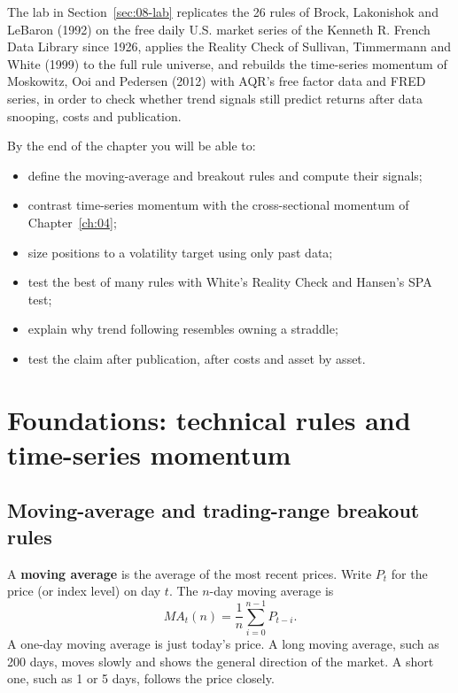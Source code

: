 The lab in Section~\ref{sec:08-lab} replicates the 26 rules of Brock, Lakonishok and LeBaron (1992) on the free daily U.S. market series of the Kenneth R. French Data Library since 1926, applies the Reality Check of Sullivan, Timmermann and White (1999) to the full rule universe, and rebuilds the time-series momentum of Moskowitz, Ooi and Pedersen (2012) with AQR's free factor data and FRED series, in order to check whether trend signals still predict returns after data snooping, costs and publication.

By the end of the chapter you will be able to:

\begin{itemize}
  \item define the moving-average and breakout rules and compute their signals;
  \item contrast time-series momentum with the cross-sectional momentum of Chapter~\ref{ch:04};
  \item size positions to a volatility target using only past data;
  \item test the best of many rules with White's Reality Check and Hansen's SPA test;
  \item explain why trend following resembles owning a straddle;
  \item test the claim after publication, after costs and asset by asset.
\end{itemize}


\section{Foundations: technical rules and time-series momentum}
\label{sec:08-foundations}

\subsection{Moving-average and trading-range breakout rules}

A \textbf{moving average} is the average of the most recent prices. Write $P_t$ for the price (or index level) on day $t$. The $n$-day moving average is
\begin{equation}
  MA_t(n) = \frac{1}{n} \sum_{i=0}^{n-1} P_{t-i}.
  \label{eq:08-ma}
\end{equation}
A one-day moving average is just today's price. A long moving average, such as 200 days, moves slowly and shows the general direction of the market. A short one, such as 1 or 5 days, follows the price closely.

